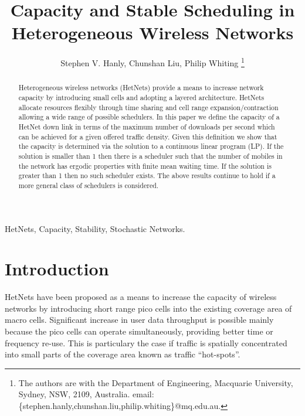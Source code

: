 \documentclass[12pt, draftcls, onecolumn]{IEEEtranTCOM}
\begin{document}
\sloppy

\title{Capacity and Stable Scheduling in Heterogeneous Wireless Networks}



\author{Stephen V. Hanly, Chunshan Liu, Philip Whiting
\thanks{The authors are with the Department of Engineering, Macquarie University, Sydney, NSW, 2109, Australia. email: \{stephen.hanly,chunshan.liu,philip.whiting\}@mq.edu.au.}
}


\maketitle


\begin{abstract}
Heterogeneous wireless networks (HetNets) provide a means to increase network capacity by introducing
small cells and adopting a layered architecture. HetNets allocate resources flexibly
through time sharing and cell range expansion/contraction allowing a
wide range of possible schedulers. In this paper we define the capacity of a HetNet down link in terms of the maximum number of downloads
per second which can be achieved for a given offered traffic density. Given this definition
we show that the capacity is determined via the solution to a continuous linear program (LP).
If the solution is smaller than 1 then there is a scheduler such that the
number of mobiles in the network has ergodic properties with finite mean waiting time.
If the solution is greater than 1 then no such scheduler exists. The above results continue to hold if a more general class of schedulers is considered.
\end{abstract}

\begin{IEEEkeywords}
HetNets, Capacity, Stability, Stochastic Networks.
\end{IEEEkeywords}


\section{Introduction}
\label{sec_intro}
HetNets have been proposed as a means to increase the
capacity of wireless networks by introducing short range pico cells
into the existing coverage area of macro cells. Significant increase in user data
throughput is possible mainly because the pico cells can operate simultaneously, providing better time or frequency re-use. This is particulary the case if traffic is
spatially concentrated into small parts of the coverage area known
as traffic ``hot-spots''.
\end{document}
